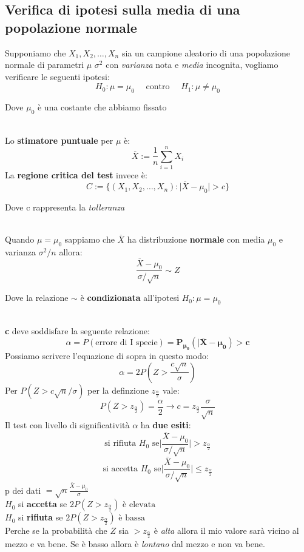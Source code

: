 \documentclass[]{article}
\begin{document}
    \subsection{Verifica di ipotesi sulla media di una popolazione normale}
    Supponiamo che $X_1, X_2, \ldots, X_n$ sia un campione aleatorio di una popolazione normale di parametri $\mu$ $\sigma^2$ con \textit{varianza} nota e \textit{media} incognita, vogliamo verificare le seguenti ipotesi:
    \[ H_0 : \mu = \mu_0 \quad \text{ contro } \quad H_1 : \mu \not = \mu_0 \]
    \centerline{Dove $\mu_0$ è una costante che abbiamo fissato} \\[2ex]
    Lo \textbf{stimatore puntuale} per $\mu$ è:
    \[ \overline{X} := \frac{1}{n} \sum_{i=1}^{n} X_i \]
    La \textbf{regione critica del test} invece è:
    \[ C := \{ (X_1, X_2, \ldots, X_n) : \rvert \overline{X} - \mu_0 \rvert > c \} \]
    \centerline{Dove c rappresenta la \textit{tolleranza}} \\[2ex]
    Quando $\mu = \mu_0$ sappiamo che $\overline{X}$ ha distribuzione \textbf{normale} con media $\mu_0$ e varianza $\sigma^2 / n$ allora:
    \[ \frac{\overline{X} - \mu_0}{\sigma / \sqrt{n}} \sim Z \]
    \centerline{Dove la relazione $\sim$ è \textbf{condizionata} all'ipotesi $H_0 : \mu = \mu_0$} \\[2ex]
    \textbf{c} deve soddisfare la seguente relazione:
    \[ \alpha = P(\text{errore di I specie}) = \boldsymbol{P_{\mu_0}(\rvert \overline{X} - \mu_0) > c} \]
    Possiamo scrivere l'equazione di sopra in questo modo:
    \[ \alpha = 2P \left( Z > \frac{c \sqrt{n}}{\sigma} \right) \]
    Per $P(Z > c \sqrt{n} / \sigma)$ per la definzione $z_{\frac{\alpha}{2}}$ vale:
    \[ P\left( Z > z_{\frac{\alpha}{2}} \right)= \frac{\alpha}{2} \longrightarrow c = z_{\frac{\alpha}{2}} \frac{\sigma}{\sqrt{n}}\]
    Il test con livello di significatività $\alpha$ ha \textbf{due esiti}:
    \[ \text{si rifiuta } H_0 \text{ se} \bigg\rvert \frac{\overline{X} - \mu_0}{\sigma / \sqrt{n}} \bigg\rvert > z_{\frac{\alpha}{2}} \]
    \[ \text{si accetta } H_0 \text{ se} \bigg\rvert \frac{\overline{X} - \mu_0}{\sigma / \sqrt{n}} \bigg\rvert \leq z_{\frac{\alpha}{2}} \]
    p dei dati $= \sqrt{n} \frac{\overline{X} - \mu_0}{\sigma}$ \\[2ex]
    $H_0$ si \textbf{accetta} se $2P(Z > z_{\frac{\alpha}{2}}) \text{ è elevata}$ \\
    $H_0$ si \textbf{rifiuta} se $2P(Z > z_{\frac{\alpha}{2}}) \text{ è bassa}$ \\
    Perche se la probabilità che $Z$ sia $> z_{\frac{\alpha}{2}}$ è \textit{alta} allora il mio valore sarà vicino al mezzo e va bene. Se è basso allora è \textit{lontano} dal mezzo e non va bene.
\end{document}
